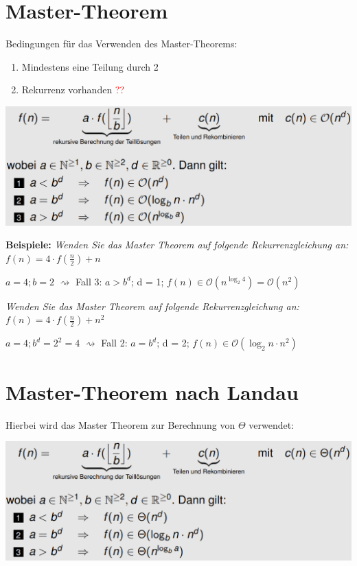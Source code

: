\documentclass[12pt,a4paper]{article}
\begin{document}
\section{Master-Theorem}
Bedingungen für das Verwenden des Master-Theorems:
\begin{enumerate}
	\item Mindestens eine Teilung durch 2
	\item Rekurrenz vorhanden \textcolor{red}{??}
\end{enumerate}
\begin{center}
	\includegraphics[scale=.8]{Bilder/MasterTheorem.PNG}
\end{center}
\textbf{Beispiele:}\newline
\textit{Wenden Sie das Master Theorem auf folgende Rekurrenzgleichung an:} $f(n)= 4\cdot f(\frac{n}{2}) +  n$\newline
\begin{center}
	$a = 4; b = 2$ $\rightsquigarrow $ Fall 3: $a>b^d$; d = 1;\newline
	$f(n) \in \mathcal{O}(n^{\log_2 4}) = \mathcal{O}(n^2)$
\end{center}
\vspace{.8cm}
\textit{Wenden Sie das Master Theorem auf folgende Rekurrenzgleichung an:} $f(n)= 4\cdot f(\frac{n}{2}) +  n^2$\newline
\begin{center}
	$a = 4; b^d = 2^2 = 4$ $\rightsquigarrow $ Fall 2: $a=b^d$; d = 2;\newline
	$f(n) \in \mathcal{O}(\log_2 n \cdot n^2)$
\end{center}

\section{Master-Theorem nach Landau}
\label{sec:MasterLandau}
Hierbei wird das Master Theorem zur Berechnung von $\Theta $ verwendet:\newline
\begin{center}
	\includegraphics[scale=.8]{Bilder/MasterTheoremLandau.PNG}
\end{center}
\end{document}
